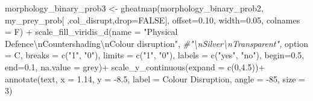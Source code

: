\documentclass[
]{article}
\newenvironment{Shaded}{\begin{snugshade}}{\end{snugshade}}
\newcommand{\AttributeTok}[1]{\textcolor[rgb]{0.77,0.63,0.00}{#1}}
\newcommand{\CommentTok}[1]{\textcolor[rgb]{0.56,0.35,0.01}{\textit{#1}}}
\newcommand{\ConstantTok}[1]{\textcolor[rgb]{0.00,0.00,0.00}{#1}}
\newcommand{\DecValTok}[1]{\textcolor[rgb]{0.00,0.00,0.81}{#1}}
\newcommand{\FloatTok}[1]{\textcolor[rgb]{0.00,0.00,0.81}{#1}}
\newcommand{\FunctionTok}[1]{\textcolor[rgb]{0.00,0.00,0.00}{#1}}
\newcommand{\NormalTok}[1]{#1}
\newcommand{\OtherTok}[1]{\textcolor[rgb]{0.56,0.35,0.01}{#1}}
\newcommand{\SpecialCharTok}[1]{\textcolor[rgb]{0.00,0.00,0.00}{#1}}
\newcommand{\StringTok}[1]{\textcolor[rgb]{0.31,0.60,0.02}{#1}}
\begin{document}
\begin{Shaded}
\begin{Highlighting}[]
\NormalTok{morphology\_binary\_prob3 }\OtherTok{\textless{}{-}} \FunctionTok{gheatmap}\NormalTok{(morphology\_binary\_prob2, my\_prey\_prob[ ,}\StringTok{\textquotesingle{}col\_disrupt\textquotesingle{}}\NormalTok{,}\AttributeTok{drop=}\ConstantTok{FALSE}\NormalTok{],}
                                    \AttributeTok{offset=}\FloatTok{0.10}\NormalTok{, }\AttributeTok{width=}\FloatTok{0.05}\NormalTok{, }\AttributeTok{colnames =}\NormalTok{ F) }\SpecialCharTok{+}
  \FunctionTok{scale\_fill\_viridis\_d}\NormalTok{(}\AttributeTok{name =} \StringTok{"Physical Defence}\SpecialCharTok{\textbackslash{}n}\StringTok{Countershading}\SpecialCharTok{\textbackslash{}n}\StringTok{Colour disruption"}\NormalTok{, }\CommentTok{\#"\textbackslash{}nSilver\textbackslash{}nTransparent", }
                       \AttributeTok{option =} \StringTok{\textquotesingle{}C\textquotesingle{}}\NormalTok{,}
                       \AttributeTok{breaks =} \FunctionTok{c}\NormalTok{(}\StringTok{"1"}\NormalTok{, }\StringTok{"0"}\NormalTok{),}
                       \AttributeTok{limits =} \FunctionTok{c}\NormalTok{(}\StringTok{"1"}\NormalTok{, }\StringTok{"0"}\NormalTok{),}
                       \AttributeTok{labels =} \FunctionTok{c}\NormalTok{(}\StringTok{"yes"}\NormalTok{, }\StringTok{"no"}\NormalTok{),}
                       \AttributeTok{begin=}\FloatTok{0.5}\NormalTok{, }\AttributeTok{end=}\FloatTok{0.1}\NormalTok{, }
                       \AttributeTok{na.value =} \StringTok{\textquotesingle{}grey\textquotesingle{}}\NormalTok{)}\SpecialCharTok{+}
  \FunctionTok{scale\_y\_continuous}\NormalTok{(}\AttributeTok{expand =} \FunctionTok{c}\NormalTok{(}\DecValTok{0}\NormalTok{,}\FloatTok{4.5}\NormalTok{))}\SpecialCharTok{+}
  \FunctionTok{annotate}\NormalTok{(}\StringTok{\textquotesingle{}text\textquotesingle{}}\NormalTok{, }\AttributeTok{x =} \FloatTok{1.14}\NormalTok{, }\AttributeTok{y =} \SpecialCharTok{{-}}\FloatTok{8.5}\NormalTok{, }\AttributeTok{label =} \StringTok{\textquotesingle{}Colour Disruption\textquotesingle{}}\NormalTok{, }\AttributeTok{angle =} \SpecialCharTok{{-}}\DecValTok{85}\NormalTok{, }\AttributeTok{size =} \DecValTok{3}\NormalTok{)}


\end{Highlighting}
\end{Shaded}
\end{document}
